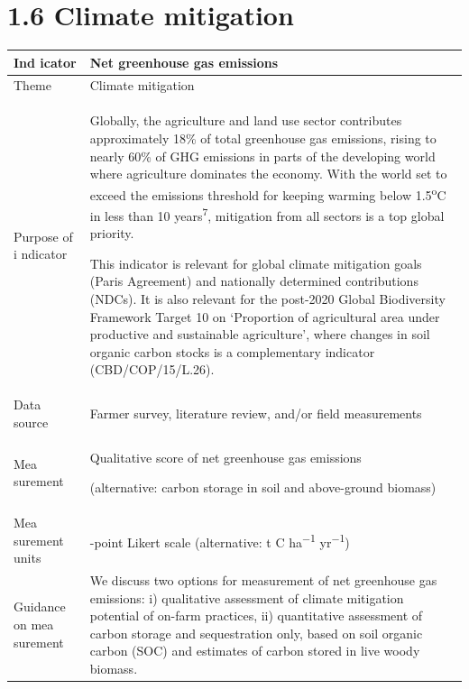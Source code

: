 \documentclass[
  letterpaper,
  DIV=11,
  numbers=noendperiod]{scrreprt}
\begin{document}
\chapter{1.6 Climate mitigation}\label{climate-mitigation}

\begin{longtable}[]{@{}
  >{\raggedright\arraybackslash}p{}
  >{\raggedright\arraybackslash}p{}@{}}
\toprule\noalign{}
\begin{minipage}[b]{\linewidth}\raggedright
\textbf{Ind icator}
\end{minipage} & \begin{minipage}[b]{\linewidth}\raggedright
\textbf{Net greenhouse gas emissions}
\end{minipage} \\
\midrule\noalign{}
\endhead
\bottomrule\noalign{}
\endlastfoot
Theme & Climate mitigation \\
Purpose of i ndicator & Globally, the agriculture and land use sector
contributes approximately 18\% of total greenhouse gas emissions, rising
to nearly 60\% of GHG emissions in parts of the developing world where
agriculture dominates the economy. With the world set to exceed the
emissions threshold for keeping warming below 1.5\textsuperscript{o}C in
less than 10 years\textsuperscript{7}, mitigation from all sectors is a
top global priority.

This indicator is relevant for global climate mitigation goals (Paris
Agreement) and nationally determined contributions (NDCs). It is also
relevant for the post-2020 Global Biodiversity Framework Target 10 on
`Proportion of agricultural area under productive and sustainable
agriculture', where changes in soil organic carbon stocks is a
complementary indicator (CBD/COP/15/L.26). \\
Data source & Farmer survey, literature review, and/or field
measurements \\
Mea surement & Qualitative score of net greenhouse gas emissions

(alternative: carbon storage in soil and above-ground biomass) \\
Mea surement units & 5-point Likert scale (alternative: t C
ha\textsuperscript{−1} yr\textsuperscript{−1}) \\
Guidance on mea surement & \begin{minipage}[t]{\linewidth}\raggedright
We discuss two options for measurement of net greenhouse gas emissions:
i) qualitative assessment of climate mitigation potential of on-farm
practices, ii) quantitative assessment of carbon storage and
sequestration only, based on soil organic carbon (SOC) and estimates of
carbon stored in live woody biomass.


\end{minipage}
\end{longtable}
\end{document}
